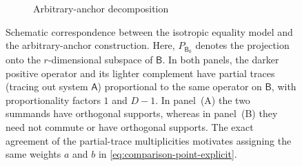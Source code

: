 \documentclass[11pt,reqno]{amsart}
\theoremstyle{definition}
\DeclareMathOperator{\Tr}{Tr}
\newcommand{\A}{\mathsf{A}}
\newcommand{\B}{\mathsf{B}}
\begin{document}
\begin{figure}[htbp]
\begin{subfigure}[t]{0.48\textwidth}
		\caption{Arbitrary-anchor decomposition}
		\label{fig:envelope_generalization}
	\end{subfigure}
	
	\caption{
		Schematic correspondence between the isotropic equality model and the
		arbitrary-anchor construction. 
        Here, $P_{\B_0}$ denotes the projection onto the $r$-dimensional subspace of $\B$.
        In both panels, the darker positive
		operator and its lighter complement have partial traces (tracing out system $\A$) proportional to
		the same operator on $\B$, with proportionality factors $1$ and $D-1$.
		In panel~{(A)}
		the two summands have orthogonal supports, whereas in panel~{(B)}
		they need not commute or have orthogonal supports.
		The
		exact agreement of the partial-trace multiplicities motivates assigning
		the same weights $a$ and $b$ in
		\cref{eq:comparison-point-explicit}.
	}
	\label{fig:schmidt-envelope}
	
\end{figure}
\end{document}
